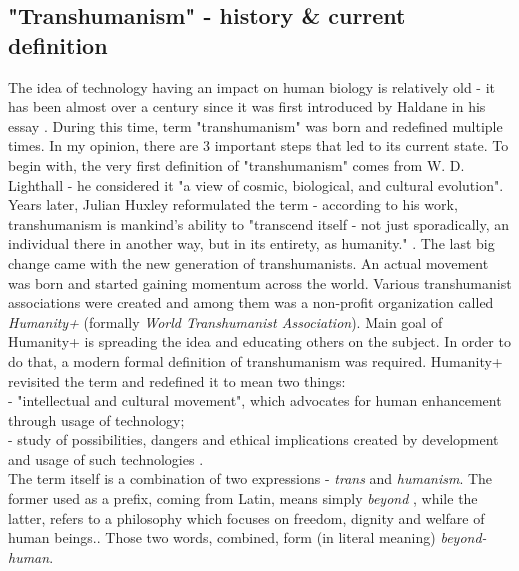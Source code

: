 \documentclass[12pt]{article}
\begin{document}
\subsection{"Transhumanism" - history \& current definition}
	The idea of technology having an impact on human biology is relatively old - it has been almost over a century since it was first introduced by Haldane in his essay \cite{haldane}. During this time, term "transhumanism" was born and redefined multiple times. In my opinion, there are 3 important steps that led to its current state. To begin with, the very first definition of "transhumanism" comes from W. D. Lighthall - he considered it "a view of cosmic, biological, and cultural evolution"\cite{transhumanismHistoryLighthall}. Years later, Julian Huxley reformulated the term - according to his work, transhumanism is mankind's ability to "transcend itself - not just sporadically, an individual there in another way, but in its entirety, as humanity." \cite{transhumanismHistoryHuxley}. The last big change came with the new generation of transhumanists. An actual movement was born and started gaining momentum across the world. Various transhumanist associations were created and among them was a non-profit organization called \emph{Humanity+} (formally \emph{World Transhumanist Association}). Main goal of Humanity+ is spreading the idea and educating others on the subject. In order to do that, a modern formal definition of transhumanism was required. Humanity+ revisited the term and redefined it to mean two things: 
	\\- "intellectual and cultural movement", which advocates for human enhancement through usage of technology;
	\\- study of possibilities, dangers and ethical implications created by development and usage of such technologies \cite{transhumanistFAQ:1}.
	\\The term itself is a combination of two expressions - \emph{trans} and \emph{humanism}. The former used as a prefix, coming from Latin, means simply \emph{beyond} \cite{transTermDictionary}, while the latter, refers to a philosophy which focuses on freedom, dignity and welfare of human beings.\cite{humanism:1}. Those two words, combined, form (in literal meaning) \emph{beyond-human}. 
\end{document}
